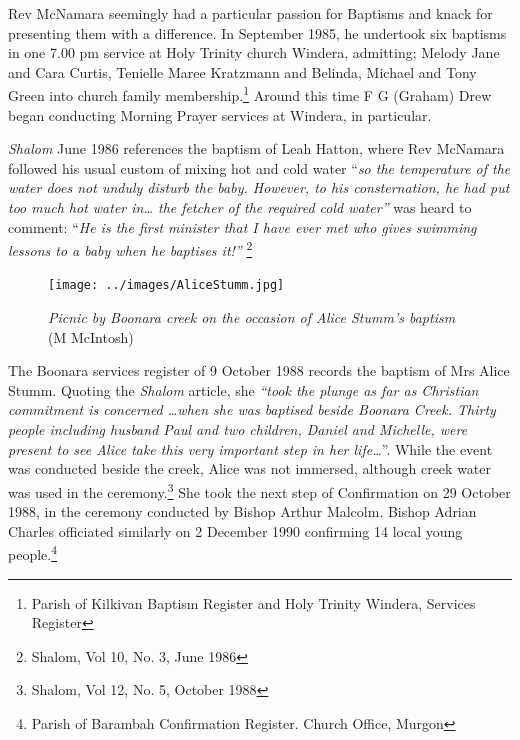 Rev McNamara seemingly had a particular passion for Baptisms and knack for presenting them with a difference. In September 1985, he undertook six baptisms in one 7.00 pm service at Holy Trinity church Windera, admitting; Melody Jane and Cara Curtis, Tenielle Maree Kratzmann and Belinda, Michael and Tony Green into church family membership.\footnote{Parish of Kilkivan Baptism Register and Holy Trinity Windera, Services Register} Around this time F G (Graham) Drew began conducting Morning Prayer services at Windera, in particular.


\emph{Shalom} June 1986 references the baptism of Leah Hatton, where Rev McNamara followed his usual custom of mixing hot and cold water ``\emph{so the temperature of the water does not unduly disturb the baby. However, to his consternation, he had put too much hot water in\ldots{} the fetcher of the required cold water''} was heard to comment: ``\emph{He is the first minister that I have ever met who gives swimming lessons to a baby when he baptises it!''} \footnote{Shalom, Vol 10, No. 3, June 1986}








\begin{figure}
\begin{center}
\texttt{[image: ../images/AliceStumm.jpg]}
\caption{{\itshape Picnic by Boonara creek on the occasion of Alice Stumm's baptism} {\scriptsize(M McIntosh)}}
\end{center}
\end{figure}




The Boonara services register of 9 October 1988 records the baptism of Mrs Alice Stumm. Quoting the \emph{Shalom} article, she \emph{``took the plunge as far as Christian commitment is concerned \ldots when she was baptised beside Boonara Creek. Thirty people including husband Paul and two children, Daniel and Michelle, were present to see Alice take this very important step in her life\ldots{}}''. While the event was conducted beside the creek, Alice was not immersed, although creek water was used in the ceremony.\footnote{Shalom, Vol 12, No. 5, October 1988} She took the next step of Confirmation on 29 October 1988, in the ceremony conducted by Bishop Arthur Malcolm. Bishop Adrian Charles officiated similarly on 2 December 1990 confirming 14 local young people.\footnote{Parish of Barambah Confirmation Register. Church Office, Murgon}


